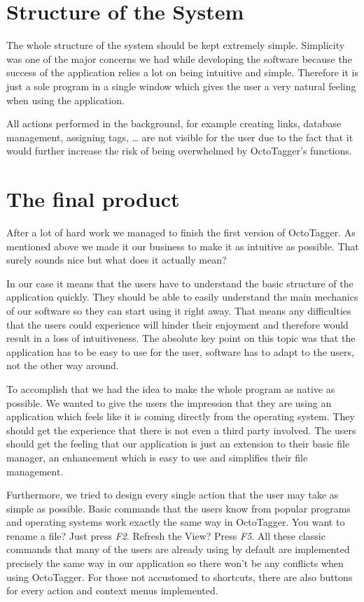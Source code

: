\def\kapitelautor{Christoph Führer}

\section{Structure of the System}
The whole structure of the system should be kept extremely simple. Simplicity was one of the major concerns we had while developing the software because the success of the application relies a lot on being intuitive and simple. Therefore it is just a sole program in a single window which gives the user a very natural feeling when using the application.

All actions performed in the background, for example creating links, database management, assigning tags, \ldots{} are not visible for the user due to the fact that it would further increase the risk of being overwhelmed by OctoTagger's functions.

\section{The final product}
After a lot of hard work we managed to finish the first version of OctoTagger. As mentioned above we made it our business to make it as intuitive as possible. That surely sounds nice but what does it actually mean?

In our case it means that the users have to understand the basic structure of the application quickly. They should be able to easily understand the main mechanics of our software so they can start using it right away. That means any difficulties that the users could experience will hinder their enjoyment and therefore would result in a loss of intuitiveness. The absolute key point on this topic was that the application has to be easy to use for the user, software has to adapt to the users, not the other way around.

To accomplish that we had the idea to make the whole program as native as possible. We wanted to give the users the impression that they are using an application which feels like it is coming directly from the operating system. They should get the experience that there is not even a third party involved. The users should get the feeling that our application is just an extension to their basic file manager, an enhancement which is easy to use and simplifies their file management.

Furthermore, we tried to design every single action that the user may take as simple as possible. Basic commands that the users know from popular programs and operating systems work exactly the same way in OctoTagger. You want to rename a file? Just press \textit{F2}. Refresh the View? Press \textit{F5}. All these classic commands that many of the users are already using by default are implemented precisely the same way in our application so there won't be any conflicts when using OctoTagger. For those not accustomed to shortcuts, there are also buttons for every action and context menus implemented.

